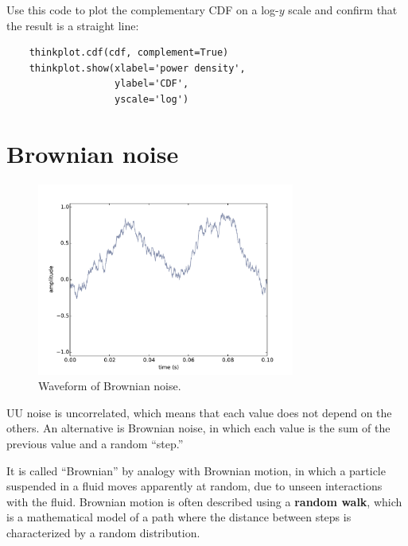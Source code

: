 \documentclass[12pt]{book}
\begin{document}
\begin{exercise}

Use this code to plot the complementary CDF on a log-$y$ scale
and confirm that the result is a straight line:

\begin{verbatim}
    thinkplot.cdf(cdf, complement=True)
    thinkplot.show(xlabel='power density',
                   ylabel='CDF',
                   yscale='log')
\end{verbatim}

\end{exercise}




\section{Brownian noise}

\begin{figure}
\centerline{\includegraphics[height=2.5in]{figs/rednoise0.pdf}}
\caption{Waveform of Brownian noise.}
\label{fig.noise0}
\end{figure}

UU noise is uncorrelated, which means that each value does not depend
on the others.  An alternative is Brownian noise, in which each value
is the sum of the previous value and a random ``step.''

It is called ``Brownian'' by analogy with Brownian motion, in which a
particle suspended in a fluid moves apparently at random, due to
unseen interactions with the fluid.  Brownian motion is often
described using a {\bf random walk}, which is a mathematical model 
of a path where the distance between steps is characterized by a
random distribution.
\end{document}
